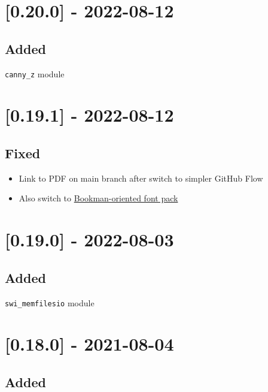 \section{[0.20.0] - 2022-08-12}

\subsection{Added}

\begin{shortlist}
    \item \verb$canny_z$ module
\end{shortlist}

\section{[0.19.1] - 2022-08-12}

\subsection{Fixed}

\begin{itemize}
    \item Link to PDF on main branch after switch to simpler GitHub Flow
    \item Also switch to \href{https://www.overleaf.com/learn/latex/Font_typefaces}{Bookman-oriented  font pack}
\end{itemize}

\section{[0.19.0] - 2022-08-03}

\subsection{Added}

\begin{shortlist}
    \item \verb$swi_memfilesio$ module
\end{shortlist}

\section{[0.18.0] - 2021-08-04}

\subsection{Added}

